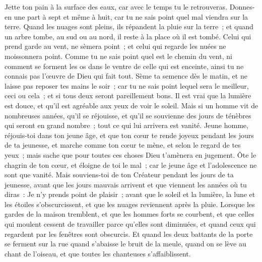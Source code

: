\begin{multicols}{2}
\VerseOne{}Jette ton pain à la surface des eaux, car avec le temps tu le retrouveras.
Donnes-en une part à sept et même à huit, car tu ne sais point quel mal viendra sur la terre.
Quand les nuages sont pleins, ils répandent la pluie sur la terre~; et quand un arbre tombe, au sud ou au nord, il reste à la place où il est tombé.
Celui qui prend garde au vent, ne sèmera point~; et celui qui regarde les nuées ne moissonnera point.
Comme tu ne sais point quel est le chemin du vent, ni comment se forment les os dans le ventre de celle qui est enceinte, ainsi tu ne connais pas l'œuvre de Dieu qui fait tout.
 Sème ta semence dès le matin, et ne laisse pas reposer tes mains le soir~; car tu ne sais point lequel sera le meilleur, ceci ou cela~; et si tous deux seront pareillement bons.
Il est vrai que la lumière est douce, et qu'il est agréable aux yeux de voir le soleil.
Mais si un homme vit de nombreuses années, qu'il se réjouisse, et qu'il se souvienne des jours de ténèbres qui seront en grand nombre~; tout ce qui lui arrivera est vanité.
\VerseOne{}Jeune homme, réjouis-toi dans ton jeune âge, et que ton cœur te rende joyeux pendant les jours de ta jeunesse, et marche comme ton cœur te mène, et selon le regard de tes yeux~; mais sache que pour toutes ces choses Dieu t'amènera en jugement.
Ôte le chagrin de ton cœur, et éloigne de toi le mal~; car le jeune âge et l'adolescence ne sont que vanité.
Mais souviens-toi de ton Créateur pendant les jours de ta jeunesse, avant que les jours mauvais arrivent et que viennent les années où tu diras~: Je n'y prends point de plaisir~;
avant que le soleil et la lumière, la lune et les étoiles s'obscurcissent, et que les nuages reviennent après la pluie.
Lorsque les gardes de la maison tremblent, et que les hommes forts se courbent, et que celles qui moulent cessent de travailler parce qu'elles sont diminuées, et quand ceux qui regardent par les fenêtres sont obscurcis.
Et quand les deux battants de la porte se ferment sur la rue quand s'abaisse le bruit de la meule, quand on se lève au chant de l'oiseau, et que toutes les chanteuses s'affaiblissent.

\end{multicols}

